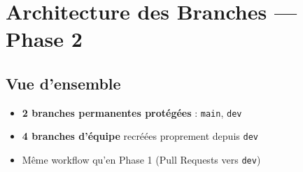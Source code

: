 \documentclass[11pt,a4paper]{article}
\begin{document}
\clearpage

\section{Architecture des Branches — Phase 2}
\label{sec:architecture}

\subsection{Vue d'ensemble}

\begin{phase2box}
\begin{itemize}
    \item \textbf{2 branches permanentes protégées} : \texttt{main}, \texttt{dev}
    \item \textbf{4 branches d'équipe} recréées proprement depuis \texttt{dev}
    \item Même workflow qu'en Phase 1 (Pull Requests vers \texttt{dev})
\end{itemize}
\end{phase2box}

\vspace{0.5cm}
\end{document}
